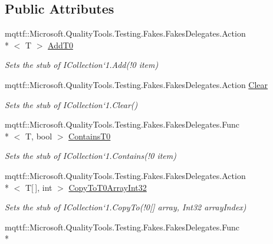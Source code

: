 \subsection*{Public Attributes}
\begin{DoxyCompactItemize}
\item 
mqttf\-::\-Microsoft.\-Quality\-Tools.\-Testing.\-Fakes.\-Fakes\-Delegates.\-Action\\*
$<$ T $>$ \hyperlink{class_system_1_1_collections_1_1_generic_1_1_fakes_1_1_stub_i_list_3_01_t_01_4_a2dc08d37f009f5e4180002778db8dc07}{Add\-T0}
\begin{DoxyCompactList}\small\item\em Sets the stub of I\-Collection`1.Add(!0 item)\end{DoxyCompactList}\item 
mqttf\-::\-Microsoft.\-Quality\-Tools.\-Testing.\-Fakes.\-Fakes\-Delegates.\-Action \hyperlink{class_system_1_1_collections_1_1_generic_1_1_fakes_1_1_stub_i_list_3_01_t_01_4_a3cf7b544aacc464cf7cb4dac87306f6a}{Clear}
\begin{DoxyCompactList}\small\item\em Sets the stub of I\-Collection`1.Clear()\end{DoxyCompactList}\item 
mqttf\-::\-Microsoft.\-Quality\-Tools.\-Testing.\-Fakes.\-Fakes\-Delegates.\-Func\\*
$<$ T, bool $>$ \hyperlink{class_system_1_1_collections_1_1_generic_1_1_fakes_1_1_stub_i_list_3_01_t_01_4_a8161a4638473b226af1cb1d7b11b7c99}{Contains\-T0}
\begin{DoxyCompactList}\small\item\em Sets the stub of I\-Collection`1.Contains(!0 item)\end{DoxyCompactList}\item 
mqttf\-::\-Microsoft.\-Quality\-Tools.\-Testing.\-Fakes.\-Fakes\-Delegates.\-Action\\*
$<$ T\mbox{[}$\,$\mbox{]}, int $>$ \hyperlink{class_system_1_1_collections_1_1_generic_1_1_fakes_1_1_stub_i_list_3_01_t_01_4_ad761aa13f54592afe6891789bda5d2ba}{Copy\-To\-T0\-Array\-Int32}
\begin{DoxyCompactList}\small\item\em Sets the stub of I\-Collection`1.Copy\-To(!0\mbox{[}\mbox{]} array, Int32 array\-Index)\end{DoxyCompactList}\item 
mqttf\-::\-Microsoft.\-Quality\-Tools.\-Testing.\-Fakes.\-Fakes\-Delegates.\-Func\\*

\end{DoxyCompactItemize}
